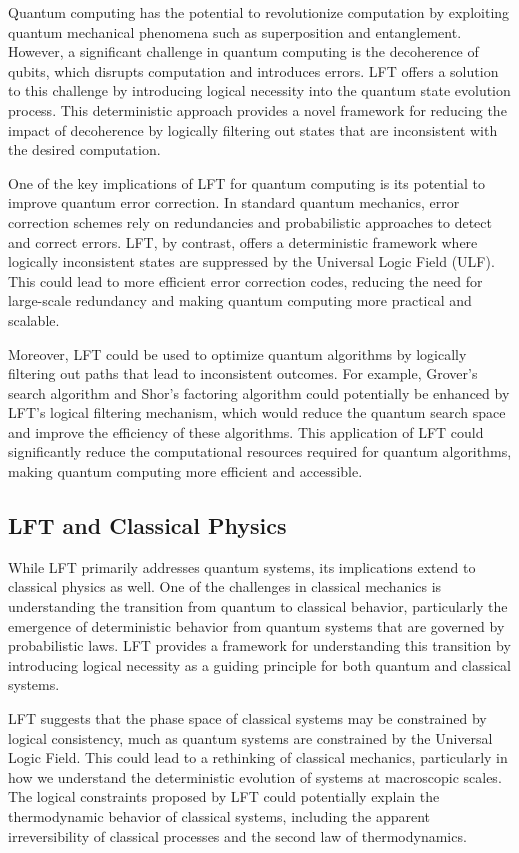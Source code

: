 Quantum computing has the potential to revolutionize computation by exploiting quantum mechanical phenomena such as superposition and entanglement. However, a significant challenge in quantum computing is the decoherence of qubits, which disrupts computation and introduces errors. LFT offers a solution to this challenge by introducing logical necessity into the quantum state evolution process. This deterministic approach provides a novel framework for reducing the impact of decoherence by logically filtering out states that are inconsistent with the desired computation.

One of the key implications of LFT for quantum computing is its potential to improve quantum error correction. In standard quantum mechanics, error correction schemes rely on redundancies and probabilistic approaches to detect and correct errors. LFT, by contrast, offers a deterministic framework where logically inconsistent states are suppressed by the Universal Logic Field (ULF). This could lead to more efficient error correction codes, reducing the need for large-scale redundancy and making quantum computing more practical and scalable.

Moreover, LFT could be used to optimize quantum algorithms by logically filtering out paths that lead to inconsistent outcomes. For example, Grover’s search algorithm and Shor’s factoring algorithm could potentially be enhanced by LFT’s logical filtering mechanism, which would reduce the quantum search space and improve the efficiency of these algorithms. This application of LFT could significantly reduce the computational resources required for quantum algorithms, making quantum computing more efficient and accessible.

\subsection{LFT and Classical Physics}

While LFT primarily addresses quantum systems, its implications extend to classical physics as well. One of the challenges in classical mechanics is understanding the transition from quantum to classical behavior, particularly the emergence of deterministic behavior from quantum systems that are governed by probabilistic laws. LFT provides a framework for understanding this transition by introducing logical necessity as a guiding principle for both quantum and classical systems.

LFT suggests that the phase space of classical systems may be constrained by logical consistency, much as quantum systems are constrained by the Universal Logic Field. This could lead to a rethinking of classical mechanics, particularly in how we understand the deterministic evolution of systems at macroscopic scales. The logical constraints proposed by LFT could potentially explain the thermodynamic behavior of classical systems, including the apparent irreversibility of classical processes and the second law of thermodynamics.

